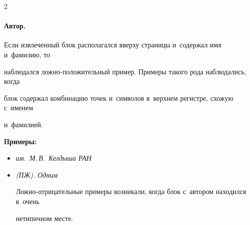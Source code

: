 \begin{multicols}{2}





\vspace*{-13pt}





\paragraph*{Автор.}





Если извлеченный блок располагался вверху страницы и~содержал имя и~фамилию, то 


наблюдался лож\-но-по\-ло\-жи\-тель\-ный пример. Примеры такого рода наблюдались, когда 


блок содержал комбинацию точек и~символов в~верх\-нем регистре, схожую с~именем 


и~фамилией.





\textbf{Примеры:}





\begin{itemize}


\item[$\bullet$]


\textit{им.\ М.\,В.~Келдыша РАН}\\[-15pt]





\item[$\bullet$]


\textit{(ПЖ). Одним}





Ложно-отрицательные примеры возникали, когда блок с~автором находился в~очень 


нетипичном месте.\\[-15pt]


\end{itemize}





\end{multicols}





